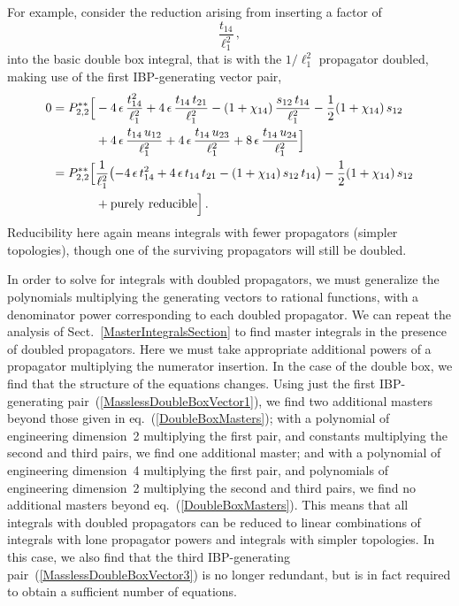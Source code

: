 \documentclass[aps,prd,preprint,groupedaddress,nofootinbib,showpacs,eqsecnum]{revtex4}
\def\sect#1{Sect.~{\ref{#1}}}
\def\eqn#1{eq.~(\ref{#1})}
\def\eps{\epsilon}
\def\Pss#1#2{P^{**}_{#1,#2}}
\begin{document}
For example, consider the reduction arising from inserting a factor of
\begin{equation}
\frac{t_{14}}{\ell_1^2}\,,
\end{equation}
into the basic double box integral, that is with the $1/\ell_1^2$ propagator 
doubled, making use of the first IBP-generating
vector pair,
\begin{equation}
\begin{aligned}
0 = \Pss22\Bigl[&
-4\,\eps\,\frac{t_{14}^{2}}{\ell_1^2}
+4\,\eps\,\frac{t_{14}\,t_{21}}{\ell_1^2}
-(1+\chi_{14})\,\frac{s_{12}\,t_{14}}{\ell_1^2}
-\frac{1}{2}(1+\chi_{14})\,s_{12}
\\ &
+4\,\eps\,\frac{t_{14}\,u_{12}}{\ell_1^2}
+4\,\eps\,\frac{t_{14}\,u_{23}}{\ell_1^2}
+8\,\eps\,\frac{t_{14}\,u_{24}}{\ell_1^2}
\Bigr]\\
= \Pss22\Bigl[
&\frac{1}{\ell_1^2} \bigl(
-4\,\eps\,{t_{14}^{2}}
+4\,\eps\,{t_{14}\,t_{21}}
-(1+\chi_{14})\,{s_{12}\,t_{14}}\bigr)
-\frac{1}{2}(1+\chi_{14})\,s_{12}
\\&+\textrm{purely\ reducible}
\Bigr]
\,.
\end{aligned}
\label{DoubledPropagatorIBP1}
\end{equation}
Reducibility here again means integrals with fewer propagators (simpler
topologies), though
one of the surviving propagators will still be doubled.  

In order to solve for integrals with doubled propagators, we must generalize
the polynomials multiplying the generating vectors to rational functions,
with a denominator power corresponding to each doubled propagator.
We can repeat the analysis of \sect{MasterIntegralsSection}
to find master integrals in the presence of doubled propagators.
Here we must take appropriate
additional powers of a propagator multiplying the numerator insertion.
In the case of the double box, we find that the structure of the
equations changes.
Using just the first IBP-generating pair~(\ref{MasslessDoubleBoxVector1}), 
we find
two additional masters beyond those given in \eqn{DoubleBoxMasters}; 
with a polynomial of engineering dimension~2 multiplying
the first pair, and constants multiplying the second and third pairs,
we find one additional master; and with a polynomial of engineering
dimension~4 multiplying the first pair, and polynomials of
engineering dimension~2 multiplying the second and third pairs,
we find no additional masters beyond
\eqn{DoubleBoxMasters}.  This means that all integrals with
doubled propagators can be reduced to linear combinations 
of integrals
with lone propagator powers and integrals with simpler topologies.
In this case, we also find that the 
third IBP-generating pair~(\ref{MasslessDoubleBoxVector3})
is no longer redundant, but is in fact required to obtain a sufficient
number of equations.
\end{document}
